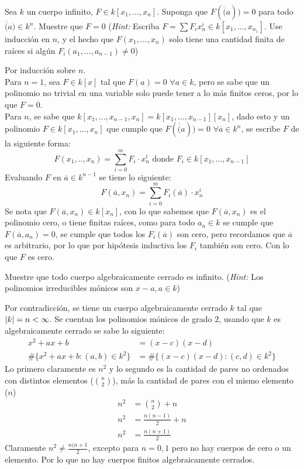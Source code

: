 \begin{prob}{1.4}
    Sea $k$ un cuerpo infinito, $F\in k[x_1,...,x_n]$. Suponga que $F(\overline(a))=0$ para todo $\overline(a)\in k^n$. Muestre que $F=0$ (\textit{Hint:} Escriba $F=\sum F_ix_n^i\in k[x_1,...,x_{n_1}]$. Use inducción en $n$, y el hecho que $F(x_1,...,x_n)$ solo tiene una cantidad finita de raíces si algún $F_i(a_1,...,a_{n-1})\neq 0$)
\end{prob}
\begin{sol}{1.2}
    Por inducción sobre $n$.\\
    Para $n=1$, sea $F\in k[x]$ tal que $F(a)=0$ $\forall a\in k$, pero se sabe que un polinomio no trivial en una variable solo puede tener a lo más finitos ceros, por lo que $F=0$.\\
    Para $n$, se sabe que $k[x_1,...,x_{n-1},x_n]=k[x_1,...,x_{n-1}][x_n]$, dado esto y un polinomio $F\in k[x_1,...,x_n]$ que cumple que $F(\overline(a))=0$ $\forall\overline{a}\in k^n$, se escribe $F$ de la siguiente forma:
    \[
        F(x_1,..,x_n)=\sum_{i=0}^m F_i\cdot x_n^i\text{ donde }F_i\in k[x_1,...,x_{n-1}]
    \]
    Evaluando $F$ en $\overline{a}\in k^{n-1}$ se tiene lo siguiente:
    \[
        F(\overline{a},x_n)=\sum_{i=0}^m F_i(\overline{a})\cdot x_n^i
    \]
    Se nota que $F(\overline{a},x_n)\in k[x_n]$, con lo que sabemos que $F(\overline{a},x_n)$ es el polinomio cero, o tiene finitas raíces, como para todo $a_n\in k$ se cumple que $F(\overline{a},a_n)=0$, se cumple que todos los $F_i(\overline{a})$ son cero, pero recordamos que $\overline{a}$ es arbitrario, por lo que por hipótesis inductiva los $F_i$ también son cero. Con lo que $F$ es cero.
\end{sol}

\begin{prob}{1.6}
    Muestre que todo cuerpo algebraicamente cerrado es infinito. (\textit{Hint:} Los polinomios irreducibles mónicos son $x-a,a\in k$)
\end{prob}

\begin{sol}{1.6}
    Por contradicción, se tiene un cuerpo algebraicamente cerrado $k$ tal que $\left|k\right|=n<\infty$. Se cuentan los polinomios mónicos de grado $2$, usando que $k$ es algebraicamente cerrado se sabe lo siguiente:
    \begin{align*}
        x^2+ax+b                    & =(x-c)(x-d)                    \\
        \#\{x^2+ax+b:(a,b)\in k^2\} & =\#\{(x-c)(x-d):(c,d)\in k^2\}
    \end{align*}
    Lo primero claramente es $n^2$ y lo segundo es la cantidad de pares no ordenados con distintos elementos ($\binom{n}{2}$), más la cantidad de pares con el mismo elemento ($n$)
    \begin{align*}
        n^2 & =\binom{n}{2}+n   \\
        n^2 & =\frac{n(n-1)}2+n \\
        n^2 & =\frac{n(n+1)}2
    \end{align*}
    Claramente $n^2\neq \frac{n(n+1}2$, excepto para $n=0,1$ pero no hay cuerpos de cero o un elemento. Por lo que no hay cuerpos finitos algebraicamente cerrados.
\end{sol}

